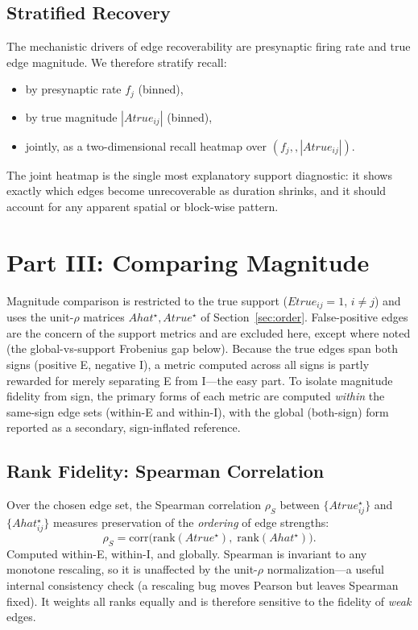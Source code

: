 \documentclass[11pt]{article}
\begin{document}
\subsection{Stratified Recovery}
\label{sec:strat}
The mechanistic drivers of edge recoverability are presynaptic firing rate and
true edge magnitude. We therefore stratify recall:
\begin{itemize}[nosep]
  \item by presynaptic rate $f_j$ (binned),
  \item by true magnitude $|Atrue_{ij}|$ (binned),
  \item jointly, as a two-dimensional recall heatmap over
        $(f_j,,|Atrue_{ij}|)$.
\end{itemize}
The joint heatmap is the single most explanatory support diagnostic: it shows
exactly which edges become unrecoverable as duration shrinks, and it should
account for any apparent spatial or block-wise pattern.

\section{Part III: Comparing Magnitude}
\label{sec:magnitude}

Magnitude comparison is restricted to the true support
($Etrue_{ij}=1$, $i\neq j$) and uses the unit-$\rho$ matrices
$Ahat^{\star},Atrue^{\star}$ of Section~\ref{sec:order}. False-positive edges
are the concern of the support metrics and are excluded here, except where
noted (the global-vs-support Frobenius gap below). Because the true edges span
both signs (positive E, negative I), a metric computed across all signs is
partly rewarded for merely separating E from I---the easy part. To isolate
magnitude fidelity from sign, the primary forms of each metric are computed
\emph{within} the same-sign edge sets (within-E and within-I), with the global
(both-sign) form reported as a secondary, sign-inflated reference.

\subsection{Rank Fidelity: Spearman Correlation}
Over the chosen edge set, the Spearman correlation $\rho_S$ between
$\{Atrue^{\star}_{ij}\}$ and $\{Ahat^{\star}_{ij}\}$ measures preservation of
the \emph{ordering} of edge strengths:
\begin{equation}
  \rho_S = \mathrm{corr}\bigl(\mathrm{rank}(Atrue^{\star}),\;
                              \mathrm{rank}(Ahat^{\star})\bigr).
\end{equation}
Computed within-E, within-I, and globally. Spearman is invariant to any
monotone rescaling, so it is unaffected by the unit-$\rho$ normalization---a
useful internal consistency check (a rescaling bug moves Pearson but leaves
Spearman fixed). It weights all ranks equally and is therefore sensitive to the
fidelity of \emph{weak} edges.
\end{document}
